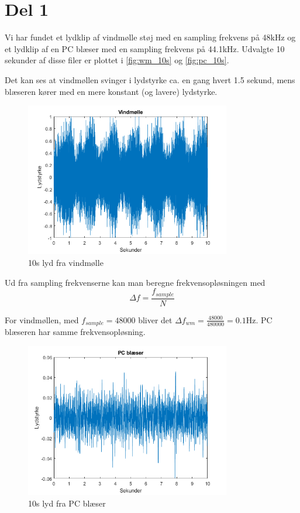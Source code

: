 \section{Del 1}

Vi har fundet et lydklip af vindmølle støj med en sampling frekvens på 48kHz og et lydklip af en PC blæser med en sampling frekvens på 44.1kHz. Udvalgte 10 sekunder af disse filer er plottet i \autoref{fig:wm_10s} og \autoref{fig:pc_10s}.

Det kan ses at vindmøllen svinger i lydstyrke ca. en gang hvert 1.5 sekund, mens blæseren kører med en mere konstant (og lavere) lydstyrke.


\begin{figure}[h]
\centering
\includegraphics[width=0.8\textwidth]{"figures/Windmill_10s"}
\caption{10s lyd fra vindmølle}
\label{fig:wm_10s}
\end{figure}

Ud fra sampling frekvenserne kan man beregne frekvensopløsningen med 
\begin{equation}
\Delta f = \frac{f_{sample}}{N}
\end{equation}

For vindmøllen, med $f_{sample}=48000$ bliver det $\Delta f_{wm} = \frac{48000}{480000} = 0.1$Hz.
PC blæseren har samme frekvensopløsning.

\begin{figure}[h]
\centering
\includegraphics[width=0.8\textwidth]{"figures/pcFan_10s"}
\caption{10s lyd fra PC blæser}
\label{fig:pc_10s}
\end{figure}

